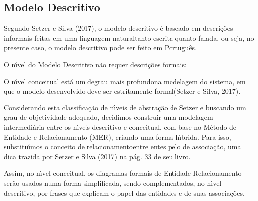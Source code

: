 \documentclass[
12pt,		%
openright,	%
twoside,  %
a4paper,			%
chapter=TITLE,		%
english,			%
french,				%
spanish,			%
brazil				%
]{USPSC-classe/USPSC}
\begin{document}
\subsection[Modelo Descritivo]{Modelo Descritivo}\label{Modelo Descritivo}
Segundo Setzer e Silva (2017), o modelo descritivo \'e baseado em \textquotedbl descri\c{c}\~oes informais feitas em uma linguagem natural\textquotedbl  tanto escrita quanto falada, ou seja, no presente caso, o modelo descritivo pode ser feito em Portugu\^es.




O n\'{\i}vel do Modelo Descritivo n\~ao requer descri\c{c}\~oes formais:





\noindent\begin{center}\mbox{\centering{}}\end{center}


O n\'{\i}vel conceitual est\'a \textquotedbl um degrau mais profundo\textquotedbl  na modelagem do sistema, em que \textquotedbl o modelo desenvolvido deve ser estritamente formal\textquotedbl  (Setzer e Silva, 2017).




Considerando esta classifica\c{c}\~ao de n\'{\i}veis de abstra\c{c}\~ao de Setzer e buscando um grau de objetividade adequado, decidimos construir uma modelagem intermedi\'aria entre os n\'{\i}veis descritivo e conceitual, com base no M\'etodo de Entidade e Relacionamento (MER), criando uma forma h\'{\i}brida. Para isso, substitu\'{\i}mos o conceito de \textquotedbl relacionamento\textquotedbl  entre entes pelo de \textquotedbl associa\c{c}\~ao\textquotedbl , uma dica trazida por  Setzer e Silva (2017) na p\'ag. 33 de seu livro.




Assim, no n\'{\i}vel conceitual, os diagramas formais de Entidade Relacionamento ser\~ao usados numa forma simplificada, sendo complementados, no n\'{\i}vel descritivo, por frases que explicam o papel das entidades e de suas associa\c{c}\~oes.
\end{document}
